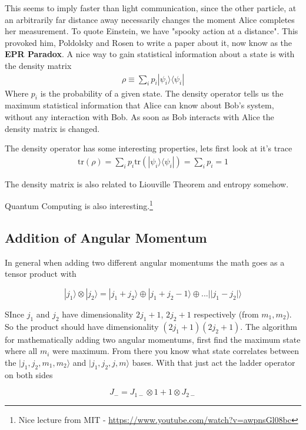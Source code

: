 This seems to imply faster than light communication, since the other particle, at an arbitrarily far distance away necessarily changes the moment Alice completes her measurement. To quote Einstein, we have "spooky action at a distance". This provoked him, Poldolsky and Rosen to write a paper about it, now know as the \textbf{EPR Paradox}. A nice way to gain statistical information about a state is with the density matrix
\begin{align}\label{density}
    \rho \equiv \sum_i p_i|\psi_i\rangle\langle \psi_i|
\end{align}
Where $p_i$ is the probability of a given state. The density operator tells us the maximum statistical information that Alice can know about Bob's system, without any interaction with Bob. As soon as Bob interacts with Alice the density matrix is changed.


The density operator has some interesting properties, lets first look at it's trace
\begin{align}
    \textrm{tr}(\rho) = \sum_i p_i \textrm{tr}(|\psi_i \rangle\langle \psi_i |) = \sum_i p_i = 1
\end{align}


The density matrix is also related to Liouville Theorem and entropy somehow.

Quantum Computing is also interesting.\footnote{Nice lecture from MIT - \url{https://www.youtube.com/watch?v=awpnsGl08bc}}



\subsection{Addition of Angular Momentum}
In general when adding two different angular momentums the math goes as a tensor product with

$$|j_1\rangle \otimes |j_2\rangle = |j_1+ j_2\rangle \oplus |j_1 + j_2 - 1\rangle \oplus ... ||j_1- j_2|\rangle$$

SInce $j_1$ and $j_2$ have dimensionality $2j_1+1$, $2j_2+1$ respectively (from $m_1, m_2$). So the product should have dimensionality $(2j_1+1)(2j_2+1)$. The algorithm for mathematically adding two angular momentums, first find the maximum state where all $m_i$ were maximum. From there you know what state correlates between the $|j_1,j_2,m_1,m_2\rangle$ and $|j_1,j_2,j,m\rangle$ bases. With that just act the ladder operator on both sides

$$J_- = J_{1-} \otimes 1 +1\otimes J_{2-}$$

